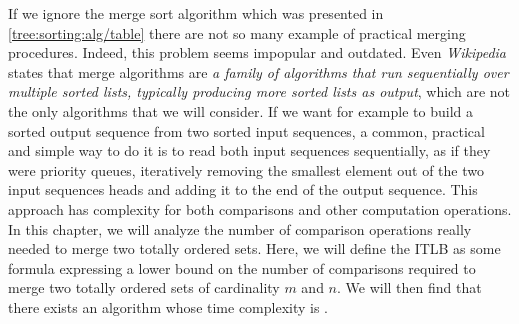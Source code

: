 \label{tree:merging:intro}

If we ignore the merge sort algorithm which was presented in
\ref{tree:sorting:alg/table} there are not so many example of practical merging
procedures. Indeed, this problem seems impopular and outdated. Even
\emph{Wikipedia} states that merge algorithms are \emph{a family of algorithms
that run sequentially over multiple sorted lists, typically producing more
sorted lists as output}, which are not the only algorithms that we will
consider. If we want for example to build a sorted output sequence from two
sorted input sequences, a common, practical and simple way to do it is to read
both input sequences sequentially, as if they were priority queues, iteratively
removing the smallest element out of the two input sequences heads and adding
it to the end of the output sequence. This approach has  complexity for
both comparisons and other computation operations. In this chapter, we will
analyze the number of comparison operations really needed to merge two totally
ordered sets. Here, we will define the ITLB as some formula expressing a lower
bound on the number of comparisons required to merge two totally ordered sets
of cardinality $m$ and $n$. We will then find that there exists an algorithm
whose time complexity is .

